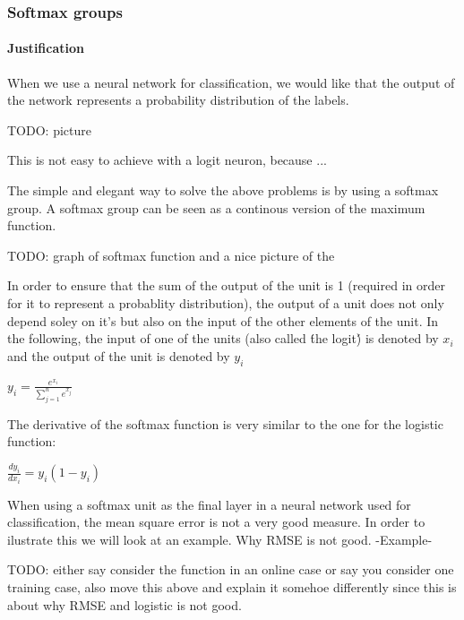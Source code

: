 \documentclass[11pt, fleqn, twoside]{article}
\begin{document}
\subsubsection {Softmax groups}

\paragraph{Justification}

  When we use a neural network for classification, we would like that the output of the network represents a probability distribution of the labels.


  TODO: picture

  This is not easy to achieve with a logit neuron, because ...

  The simple and elegant way to solve the above problems is by using a softmax group. A softmax group can be seen as a continous version of the maximum function.

  TODO: graph of softmax function and a nice picture of the

  In order to ensure that the sum of the output of the unit is 1 (required in order for it to represent a probablity distribution), the output of a unit does not only depend soley on it's but also on the input of the other elements of the unit.
  In the following, the input of one of the units (also called \'the logit\') is denoted by $x_i$ and the output of the unit is denoted by $y_i$

\begin{center} $y_i = \frac{e^{x_i}}{\sum\limits_{j=1}^n {e^{x_j}}}$ \end{center}

  The derivative of the softmax function is very similar to the one for the logistic function:

  \begin{center} $\frac{d {y_i}}{d {x_i}} = {y_i} (1-{y_i})$ \end{center}

  When using a softmax unit as the final layer in a neural network used for classification, the mean square error is not a very good measure.
  In order to ilustrate this we will look at an example.
    Why RMSE is not good.
    -Example-

  TODO: either say consider the function in an online case or say you consider one training case, also move this above and explain
  it somehoe differently since this is about why RMSE and logistic is not good.
\end{document}
